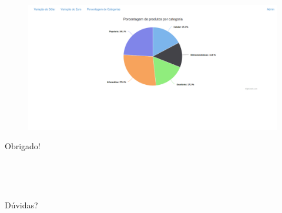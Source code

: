 \documentclass[aspectratio=169]{beamer}
\begin{document}
\begin{frame}

    \begin{figure}[h]
      \centering
        \includegraphics[width=\paperwidth]{img/product.png}
    \end{figure}

\end{frame}

\begin{frame}
	\centering
	\huge Obrigado!

	\

	\

	\large Dúvidas?
\end{frame}

\begin{frame}
	\titlepage
\end{frame}
\end{document}
